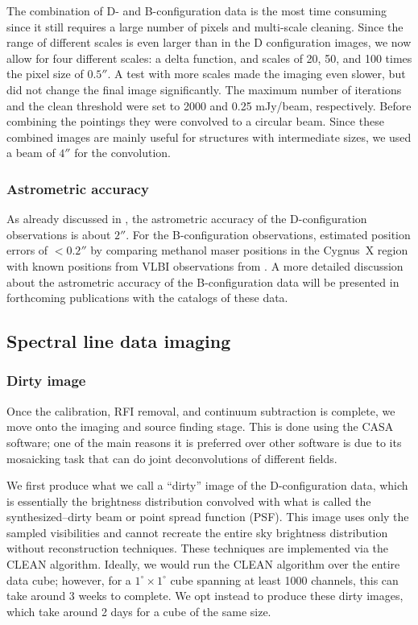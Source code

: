 \documentclass{aa}
\begin{document}
The combination of D- and B-configuration data is the most time consuming since it still requires a large number of pixels and multi-scale cleaning. Since the range of different scales is even larger than in the D configuration images, we now allow for four different scales: a delta function, and scales of 20, 50, and 100 times the pixel size of $0.5''$. A test with  more scales made the imaging even slower, but did not change the final image significantly. The maximum number of iterations and the clean threshold were set to 2000 and 0.25 mJy/beam, respectively.  Before combining the pointings they were convolved to a circular beam.  Since these combined images are mainly useful for structures with intermediate sizes, we used a beam of $4''$ for the convolution.

\subsubsection{Astrometric accuracy}
\label{sect:astrometric_accuracy}

As already discussed in \cite{Medina2019}, the astrometric accuracy of the D-configuration observations is about $2''$. For the B-configuration observations, \cite{Ortiz2021} estimated position errors of $<0.2''$ by comparing methanol maser positions in the Cygnus~X region with known positions from VLBI observations from \cite{Rygl2012}. A more detailed discussion about the astrometric accuracy of the B-configuration data will be presented in forthcoming publications with the catalogs of these data.



\subsection{Spectral line data imaging}

\subsubsection{Dirty image}
\label{sect:dirtyImage}

Once  the calibration, RFI removal, and continuum subtraction is complete, we move onto the imaging and source finding stage. This is done using the CASA software;  one of the main reasons it is preferred over other software is due to its mosaicking task that can do joint deconvolutions of different fields.

We first produce what we call a ``dirty'' image of the D-configuration data, which is essentially the brightness distribution convolved with what is called the synthesized--dirty beam or point spread function (PSF). This image uses only the sampled visibilities and cannot recreate the entire sky brightness distribution without reconstruction techniques. These techniques are implemented via the CLEAN algorithm.
Ideally, we would run the CLEAN algorithm over the entire data cube; however, for a
$1^{\circ}\times1^{\circ}$ cube spanning at least 1000 channels, this can take around 3 weeks
to complete. We opt instead to produce these dirty images, which take around 2 days for a 
cube of the same size.
\end{document}
